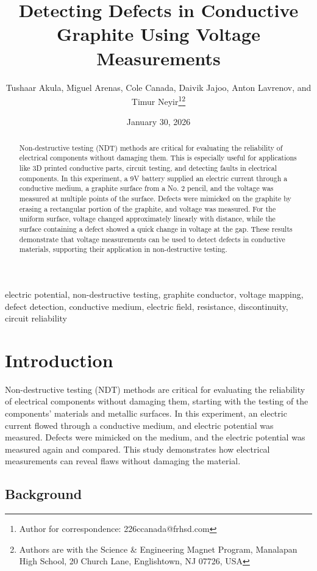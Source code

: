 \documentclass[10pt,draftcls,journal,onecolumn]{IEEEtran}
\title{Detecting Defects in Conductive Graphite Using Voltage Measurements}
\author{Tushaar Akula, Miguel Arenas, Cole Canada, Daivik Jajoo, Anton Lavrenov, and Timur Neyir\thanks{Author for correspondence: 226ccanada@frhsd.com}\thanks{Authors are with the Science \& Engineering Magnet Program, Manalapan High School, 20 Church Lane, Englishtown, NJ 07726, USA}}
\date{January 30, 2026}
\newcommand{\keywords}{electric potential, non-destructive testing, graphite conductor, voltage mapping, defect detection, conductive medium, electric field, resistance, discontinuity, circuit reliability}
\begin{document}
\linenumbers %
\maketitle

\begin{abstract}
Non-destructive testing (NDT) methods are critical for evaluating the reliability of electrical components without damaging them. This is especially useful for applications like 3D printed conductive parts, circuit testing, and detecting faults in electrical components. In this experiment, a 9V battery supplied an electric current through a conductive medium, a graphite surface from a No. 2 pencil, and the voltage was measured at multiple points of the surface. Defects were mimicked on the graphite by erasing a rectangular portion of the graphite, and voltage was measured. For the uniform surface, voltage changed approximately linearly with distance, while the surface containing a defect showed a quick change in voltage at the gap. These results demonstrate that voltage measurements can be used to detect defects in conductive materials, supporting their application in non-destructive testing.
\end{abstract}

\begin{IEEEkeywords}
\keywords
\end{IEEEkeywords}

\section{Introduction}

Non-destructive testing (NDT) methods are critical for evaluating the reliability of electrical components without damaging them, starting with the testing of the components’ materials and metallic surfaces. In this experiment, an electric current flowed through a conductive medium, and electric potential was measured. Defects were mimicked on the medium, and the electric potential was measured again and compared. This study demonstrates how electrical measurements can reveal flaws without damaging the material.

\subsection{Background}
\end{document}
